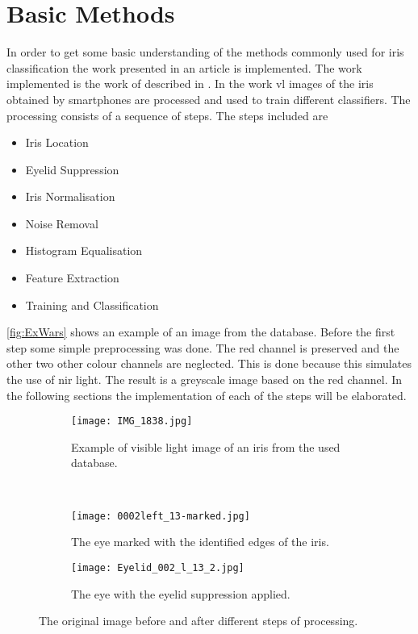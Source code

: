\section{Basic Methods}
\label{BasicM}
In order to get some basic understanding of the methods commonly used for iris classification the work presented in an article is implemented. The work implemented is the work of \cite{Khan2017a} described in \citep{Khan2017a}. In the work \gls{vl} images of the iris obtained by smartphones are processed and used to train different classifiers. The processing consists of a sequence of steps. The steps included are

\begin{itemize}
\item Iris Location
\item Eyelid Suppression
\item Iris Normalisation
\item Noise Removal
\item Histogram Equalisation 
\item Feature Extraction
\item Training and Classification
\end{itemize}
\autoref{fig:ExWars} shows an example of an image from the database. Before the first step some simple preprocessing was done. The red channel is preserved and the other two other colour channels are neglected. This is done because this simulates the use of \gls{nir} light. The result is a greyscale image based on the red channel. In the following sections the implementation of each of the steps will be elaborated. 

\begin{figure}[h]
\centering
\begin{subfigure}{.47\textwidth}
\centering
\texttt{[image: IMG\_1838.jpg]}
\caption{Example of visible light image of an iris from the used database.}
\label{fig:ExWars}
\end{subfigure}
~
\begin{subfigure}{.47\textwidth}
\centering
\texttt{[image: 0002left\_13-marked.jpg]}
\caption{The eye marked with the identified edges of the iris.}
\label{fig:MarkedI}
\end{subfigure}

\begin{subfigure}{.47\textwidth}
\centering
\texttt{[image: Eyelid\_002\_l\_13\_2.jpg]}
\caption{The eye with the eyelid suppression applied.}
\label{fig:IrisSup}
\end{subfigure}
\caption{The original image before and after different steps of processing.}
\end{figure}



